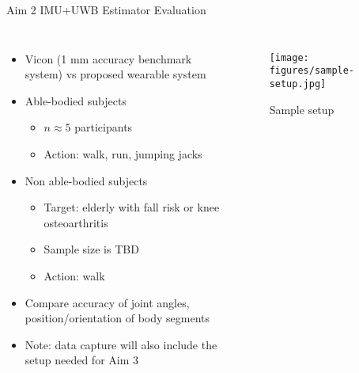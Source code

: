 \documentclass[aspectratio=169]{beamer}
\begin{document}
	    \begin{frame}{Aim 2 IMU+UWB Estimator Evaluation}
	        \begin{columns}
    	        \begin{itemize}
    	            \item Vicon (1 mm accuracy benchmark system) vs proposed wearable system
    	            \item Able-bodied subjects
    	                \begin{itemize}
    	                    \item $n \approx 5$ participants
    	                    \item Action: walk, run, jumping jacks
    	                \end{itemize}
    	            \item Non able-bodied subjects
    	                \begin{itemize}
    	                    \item Target: elderly with fall risk or knee osteoarthritis
    	                    \item Sample size is TBD
    	                    \item Action: walk
    	                \end{itemize}
                    \item Compare accuracy of joint angles, position/orientation of body segments
                    \item Note: data capture will also include the setup needed for Aim 3
    	        \end{itemize}
    	        
    	        \begin{figure}
    	            \centering
    	            \texttt{[image: figures/sample-setup.jpg]}
    	            \caption*{Sample setup}
    	        \end{figure}
	        \end{columns}
	    \end{frame}
	    
\end{document}
